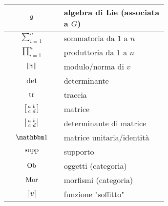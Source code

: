 \begin{table}[H]
{\begin{tabular}{|c|p{0.65\linewidth}|}
					\hline
					$ \mathfrak{g} $ & algebra di Lie (associata a $ G $) \\
					\hline
					$ \sum_{i=1}^{n} $ & sommatoria da $ 1 $ a $ n $ \\
					\hline
					$ \prod_{i=1}^{n} $ & produttoria da $ 1 $ a $ n $ \\
					\hline
					$ \norm{v} $ & modulo/norma di $ v $ \\
					\hline
					$ \det $ & determinante \\
					\hline
					$ \tr $ & traccia \\
					\hline
					$ \sbmqty{ a & b \\ c & d } $ & matrice \\
					\hline
					$ \smdet{ a & b \\ c & d } $ & determinante di matrice \\
					\hline
					$ \bigone $ & matrice unitaria/identità \\
					\hline
					$ \operatorname{supp} $ & supporto \\
					\hline
					$ \operatorname{Ob} $ & oggetti (categoria) \\
					\hline
					$ \operatorname{Mor} $ & morfismi (categoria) \\
					\hline
					$ \lceil v \rceil $ & funzione "soffitto" \\
					\hline
				\end{tabular}
				}
\end{table}
